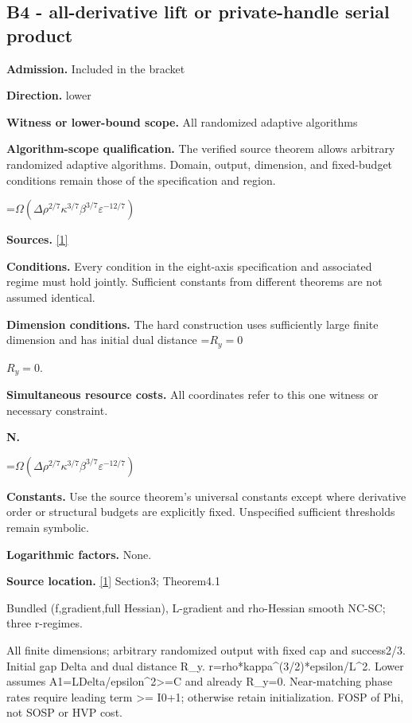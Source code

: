 \documentclass[10pt,a4paper]{article}
\newcommand{\AtlasMath}[1]{\par\begingroup\centering\setbox0=\hbox{$\displaystyle #1$}\ifdim\wd0>1.4\linewidth\typeout{ATLAS WIDE FORMULA: \the\wd0}\fi\ifdim\wd0>\linewidth\resizebox{\linewidth}{!}{\box0}\else\box0\fi\par\endgroup}
\newcommand{\AtlasInlineMath}[1]{\begingroup\setbox0=\hbox{$#1$}\ifdim\wd0>.4\linewidth\endgroup\AtlasMath{#1}\else\endgroup$#1$\fi}
\begin{document}
\subsection{B4 - all-derivative lift or private-handle serial product}
\textbf{Admission.} Included in the bracket

\textbf{Direction.} lower

\textbf{Witness or lower-bound scope.} All randomized adaptive algorithms

\textbf{Algorithm-scope qualification.} The verified source theorem allows arbitrary randomized adaptive algorithms. Domain, output, dimension, and fixed-budget conditions remain those of the specification and region.

\AtlasMath{\Omega(\Delta\rho^{2/7}\kappa^{3/7}\beta^{3/7}\varepsilon^{-12/7})}
\textbf{Sources.} \href{https://arxiv.org/pdf/2610.16771v2}{[1]}

\textbf{Conditions.} Every condition in the eight-axis specification and associated regime must hold jointly. Sufficient constants from different theorems are not assumed identical.

\textbf{Dimension conditions.} The hard construction uses sufficiently large finite dimension and has initial dual distance \AtlasInlineMath{R_y=0}.

\textbf{Simultaneous resource costs.} All coordinates refer to this one witness or necessary constraint.

\textbf{N.}

\AtlasMath{\Omega(\Delta\rho^{2/7}\kappa^{3/7}\beta^{3/7}\varepsilon^{-12/7})}
\textbf{Constants.} Use the source theorem’s universal constants except where derivative order or structural budgets are explicitly fixed. Unspecified sufficient thresholds remain symbolic.

\textbf{Logarithmic factors.} None.

\textbf{Source location.} \href{https://arxiv.org/pdf/2610.16771v2}{[1]} Section3; Theorem4.1

Bundled (f,gradient,full Hessian), L-gradient and rho-Hessian smooth NC-SC; three r-regimes.

All finite dimensions; arbitrary randomized output with fixed cap and success2/3. Initial gap Delta and dual distance R\_y. r=rho*kappa\textasciicircum{}(3/2)*epsilon/L\textasciicircum{}2. Lower assumes A1=LDelta/epsilon\textasciicircum{}2>=C and already R\_y=0. Near-matching phase rates require leading term >= I0+1; otherwise retain initialization. FOSP of Phi, not SOSP or HVP cost.
\end{document}
